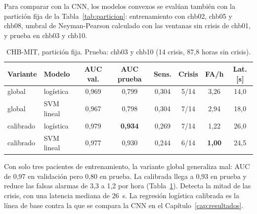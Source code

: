 Para comparar con la CNN, los modelos convexos se evalúan también con la partición fija de la Tabla~\ref{tab:particion}:
entrenamiento con chb02, chb05 y chb08, umbral de Neyman-Pearson calculado con las ventanas sin crisis de chb01, y prueba
en chb03 y chb10.

\begin{table}[ht]
\centering
\caption{CHB-MIT, partición fija. Prueba: chb03 y chb10 (14 crisis, 87,8 horas sin crisis).}
\label{tab:fija_convexos}
\begin{tabular}{llcccccc}
\toprule
Variante & Modelo & AUC val. & AUC prueba & Sens. & Crisis & FA/h & Lat. [s] \\
\midrule
global    & logística  & 0,969 & 0,799 & 0,304 & 5/14 & 3,26 & 14,0 \\
global    & SVM lineal & 0,967 & 0,798 & 0,304 & 7/14 & 2,94 & 18,0 \\
calibrado & logística  & 0,979 & \textbf{0,934} & 0,269 & 7/14 & 1,22 & 26,0 \\
calibrado & SVM lineal & 0,977 & 0,930 & 0,244 & 6/14 & \textbf{1,00} & 24,5 \\
\bottomrule
\end{tabular}
\end{table}

Con solo tres pacientes de entrenamiento, la variante global generaliza mal: AUC de 0,97 en validación pero 0,80 en
prueba. La calibrada llega a 0,93 en prueba y reduce las falsas alarmas de 3,3 a 1,2 por hora (Tabla~\ref{tab:fija_convexos}).
Detecta la mitad de las crisis, con una latencia mediana de 26~s. La regresión logística calibrada es la línea de base contra
la que se compara la CNN en el Capítulo~\ref{cap:resultados}.
